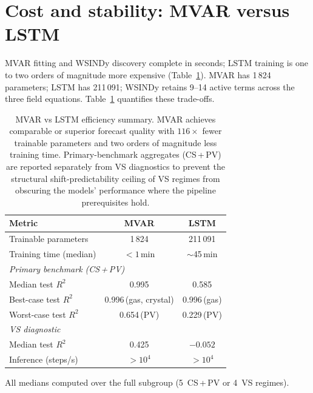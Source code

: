 \section{Cost and stability: MVAR versus LSTM}
\label{sec:ch7_cost_stability}

MVAR fitting and WSINDy discovery complete in seconds; LSTM training is
one to two orders of magnitude more expensive
(Table~\ref{tab:efficiency_summary}).  MVAR has 1\,824 parameters;
LSTM has 211\,091; WSINDy retains 9--14 active terms across the three field equations.
Table~\ref{tab:efficiency_summary} quantifies these trade-offs.

\begin{table}[ht]
\centering
\caption{MVAR vs LSTM efficiency summary.  MVAR achieves comparable or
superior forecast quality with $116\times$ fewer trainable parameters and
two orders of magnitude less training time.  Primary-benchmark aggregates
(CS\,+\,PV) are reported separately from VS diagnostics to prevent the
structural shift-predictability ceiling of VS regimes from obscuring the
models' performance where the pipeline prerequisites hold.}
\label{tab:efficiency_summary}
\renewcommand{\arraystretch}{0.95}
\small
\begin{tabular}{lcc}
\toprule
\textbf{Metric} & \textbf{MVAR} & \textbf{LSTM} \\
\midrule
Trainable parameters              & 1\,824       & 211\,091      \\
Training time (median)            & $<1$\,min    & $\sim$45\,min \\
\midrule
\multicolumn{3}{l}{\textit{Primary benchmark (CS\,+\,PV)}} \\
\quad Median test $R^2$           & 0.995        & 0.585         \\
\quad Best-case test $R^2$                 & 0.996\,(gas, crystal)  & 0.996\,(gas)  \\
\quad Worst-case test $R^2$        & 0.654\,(PV)  & 0.229\,(PV)         \\
\midrule
\multicolumn{3}{l}{\textit{VS diagnostic}} \\
\quad Median test $R^2$           & 0.425        & $-0.052$           \\
\midrule
Inference (steps/s)               & $>10^4$      & $>10^4$       \\
\bottomrule
\end{tabular}

\smallskip
{\footnotesize All medians computed over the full
subgroup (5~CS\,+\,PV or 4~VS regimes).}
\end{table}

